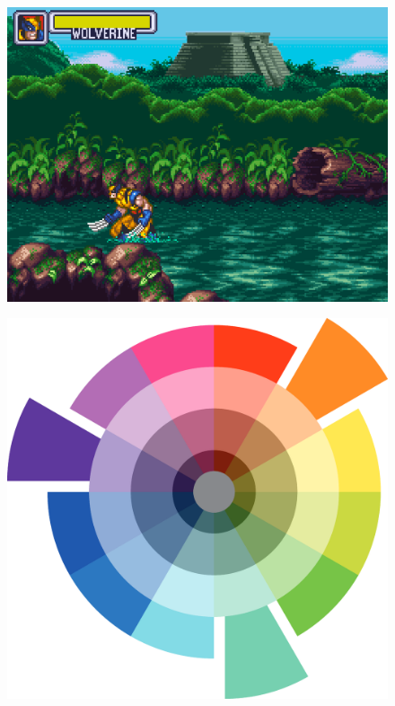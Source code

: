 \documentclass[english]{textolivre}
\begin{document}
\begin{figure}[htbp]
\begin{minipage}[t]{0.47\textwidth}
\includegraphics[width=\linewidth]{fig-002.png}
\label{fig2}
\end{minipage}
\hfill
\begin{minipage}[t]{0.47\textwidth}
\includegraphics[width=\linewidth]{fig-003.png}

\end{minipage}
\end{figure}
\end{document}
